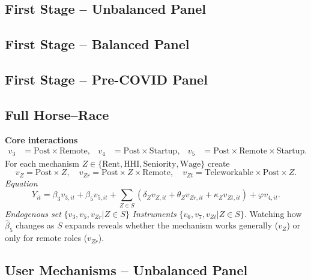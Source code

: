 \documentclass{article}
\newcommand{\cleanedresultsdir}{../results/cleaned}
\begin{document}
\subsection{First Stage -- Unbalanced Panel}


\subsection{First Stage -- Balanced Panel}


\subsection{First Stage -- Pre-COVID Panel}


\clearpage
\subsection*{Full Horse–Race}
\textbf{Core interactions}
\[\begin{aligned}
 v_3 &= \text{Post}\!\times\!\text{Remote}, &
 v_4 &= \text{Post}\!\times\!\text{Startup}, &
 v_5 &= \text{Post}\!\times\!\text{Remote}\!\times\!\text{Startup}. 
\end{aligned}\]
For each mechanism $Z\in\{\text{Rent},\text{HHI},\text{Seniority},\text{Wage}\}$ create
\[v_Z = \text{Post}\!\times\! Z,\quad v_{Zr}=\text{Post}\!\times\! Z\!\times\!\text{Remote},\quad v_{Zt}=\text{Teleworkable}\!\times\!\text{Post}\!\times\! Z.\]
\emph{Equation}
\[Y_{it}=\beta_3 v_{3,it}+\beta_5 v_{5,it}+\sum_{Z\in S}(\delta_Z v_{Z,it}+\theta_Z v_{Zr,it}+\kappa_Z v_{Zt,it})+\varphi v_{4,it}.
\]
\emph{Endogenous set}\; $\{v_3,v_5,v_{Zr}|Z\in S\}$ \quad\emph{Instruments}\; $\{v_6,v_7,v_{Zt}|Z\in S\}$.
Watching how $\widehat\beta_5$ changes as $S$ expands reveals whether the mechanism works generally ($v_Z$) or only for remote roles ($v_{Zr}$).


\clearpage
\begin{landscape}
\subsection{User Mechanisms -- Unbalanced Panel}

\end{landscape}
\end{document}

